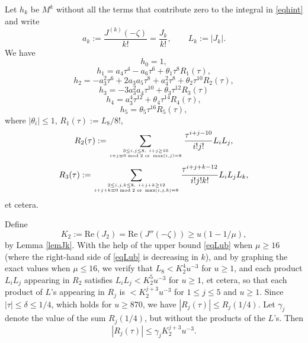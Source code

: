 \documentclass[11pt]{amsart}
\begin{document}
Let $h_k$ be $M^k$ without all the terms that contribute zero to the integral in \eqref{eqhint} and write
$$
 a_k:= \frac{J^{(k)}(-\zeta)}{k!}=\frac{J_k}{k!}, \qquad L_k:=|J_k|.
$$
We have
$$h_0=1,$$ 
$$
h_1=a_4 \tau^4 - a_6  \tau^6 +   \theta_1 \tau^8 R_1(\tau),
$$
$$
h_2= -a_3^2 \tau^6 +2a_3a_5\tau^8 +a_4^2 \tau^8
+\theta_2  \tau^{10} R_2(\tau),
$$
$$
h_3=-3a_3^2 a_4\tau^{10}  +  \theta_3   \tau^{12} R_3(\tau)
$$
$$
h_4=a_3^4 \tau^{12} + \theta_4  \tau^{14} R_4(\tau),
$$
$$
h_5 =\theta_5 \tau^{16} R_5(\tau),
$$
where $|\theta_i|\le 1$, $R_1(\tau):=L_8/8!$, 
$$
R_2(\tau):= \sum_{3\le i,j\le 8, \ i+j \ge 10 \atop  i+j \equiv 0 \bmod 2 \text{ or } \max(i,j)=8}\frac{\tau^{i+j-10}}{i!j!}L_i L_j,
$$
$$
R_3(\tau):=\sum_{3\le i,j,k\le 8, \ i+j+k \ge 12 \atop  i+j +k\equiv 0 \bmod 2 \text{ or } \max(i,j,k)=8}\frac{\tau^{i+j+k-12}}{i!j!k!} L_i L_j L_k,
$$
et cetera.

Define 
$$K_2:=\mathrm{Re}(J_2) = \mathrm{Re}(J''(-\zeta))   \ge u(1-1/\mu),$$
by Lemma \ref{lemJk}.
With the help of the upper bound \eqref{eqLub} when $\mu\ge 16$ (where the right-hand side of \eqref{eqLub}
is decreasing in $k$), and by graphing the exact values when $\mu\le 16$, 
we verify that $L_8 < K_2^4 u^{-3}$ for $u\ge 1$,
and each product $L_i L_j$ appearing in $R_2$ satisfies $L_i L_j < K_2^5  u^{-3}$ for $u\ge 1$, et cetera, so
that each product of $L$'s appearing in $R_j$ is $<K_2^{j+3} u^{-3}$ for $1\le j \le 5$ and $u\ge 1$. 
Since $|\tau|\le \delta \le 1/4$, which holds for $u\ge 870$, we have $|R_j(\tau)| \le R_j(1/4) $.
Let $ \gamma_j$ denote the value of the
sum $R_j(1/4)$, but without the products of the $L$'s. Then
$$
 |R_j(\tau)| \le \gamma_j  K_2^{j+3} u^{-3}.
$$
\end{document}
